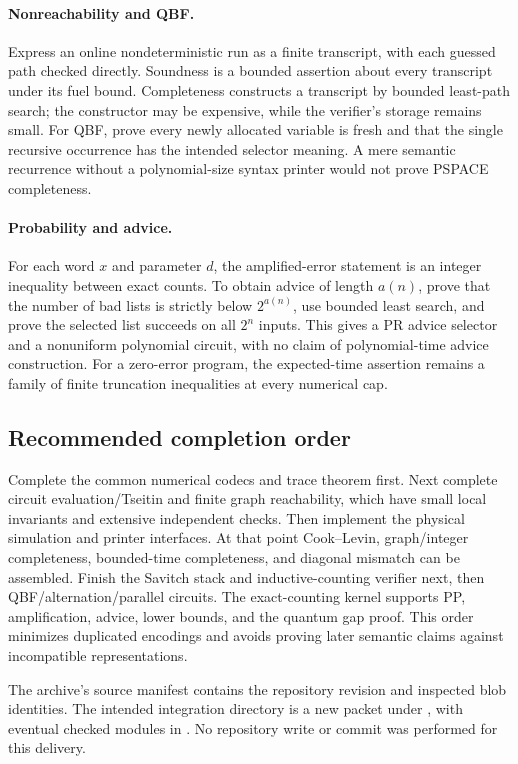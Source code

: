 \paragraph{Nonreachability and QBF.}
Express an online nondeterministic run as a finite transcript, with each guessed path checked directly. Soundness is a bounded assertion about every transcript under its fuel bound. Completeness constructs a transcript by bounded least-path search; the constructor may be expensive, while the verifier's storage remains small. For QBF, prove every newly allocated variable is fresh and that the single recursive occurrence has the intended selector meaning. A mere semantic recurrence without a polynomial-size syntax printer would not prove PSPACE completeness.

\paragraph{Probability and advice.}
For each word $x$ and parameter $d$, the amplified-error statement is an integer inequality between exact counts. To obtain advice of length $a(n)$, prove that the number of bad lists is strictly below $2^{a(n)}$, use bounded least search, and prove the selected list succeeds on all $2^n$ inputs. This gives a PR advice selector and a nonuniform polynomial circuit, with no claim of polynomial-time advice construction. For a zero-error program, the expected-time assertion remains a family of finite truncation inequalities at every numerical cap.

\subsection{Recommended completion order}
Complete the common numerical codecs and trace theorem first. Next complete circuit evaluation/Tseitin and finite graph reachability, which have small local invariants and extensive independent checks. Then implement the physical simulation and printer interfaces. At that point Cook--Levin, graph/integer completeness, bounded-time completeness, and diagonal mismatch can be assembled. Finish the Savitch stack and inductive-counting verifier next, then QBF/alternation/parallel circuits. The exact-counting kernel supports PP, amplification, advice, lower bounds, and the quantum gap proof. This order minimizes duplicated encodings and avoids proving later semantic claims against incompatible representations.

The archive's source manifest contains the repository revision and inspected blob identities. The intended integration directory is a new packet under , with eventual checked modules in . No repository write or commit was performed for this delivery.
